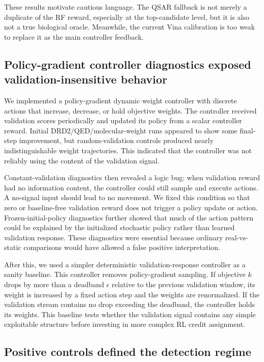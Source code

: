 \documentclass[referee,lineno,pdflatex,sn-basic]{sn-jnl}
\theoremstyle{thmstyleone}%
\theoremstyle{thmstyletwo}%
\theoremstyle{thmstylethree}%
\begin{document}
These results motivate cautious language. The QSAR fallback is not merely a duplicate of the RF reward, especially at the top-candidate level, but it is also not a true biological oracle. Meanwhile, the current Vina calibration is too weak to replace it as the main controller feedback.

\subsection{Policy-gradient controller diagnostics exposed validation-insensitive behavior}\label{subsec:pg_diagnostics}

We implemented a policy-gradient dynamic weight controller with discrete actions that increase, decrease, or hold objective weights. The controller received validation scores periodically and updated its policy from a scalar controller reward. Initial DRD2/QED/molecular-weight runs appeared to show some final-step improvement, but random-validation controls produced nearly indistinguishable weight trajectories. This indicated that the controller was not reliably using the content of the validation signal.

Constant-validation diagnostics then revealed a logic bug: when validation reward had no information content, the controller could still sample and execute actions. A no-signal input should lead to no movement. We fixed this condition so that zero or baseline-free validation reward does not trigger a policy update or action. Frozen-initial-policy diagnostics further showed that much of the action pattern could be explained by the initialized stochastic policy rather than learned validation response. These diagnostics were essential because ordinary real-vs-static comparisons would have allowed a false positive interpretation.

After this, we used a simpler deterministic validation-response controller as a sanity baseline. This controller removes policy-gradient sampling. If objective $k$ drops by more than a deadband $\epsilon$ relative to the previous validation window, its weight is increased by a fixed action step and the weights are renormalized. If the validation stream contains no drop exceeding the deadband, the controller holds its weights. This baseline tests whether the validation signal contains any simple exploitable structure before investing in more complex RL credit assignment.

\subsection{Positive controls defined the detection regime}\label{subsec:positive_control}
\end{document}
